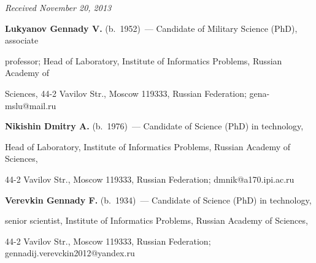 \vspace*{-6pt}





\hfill{\small\textit{Received November 20, 2013}}





\vspace*{-6pt}





\Contr





\noindent


\textbf{Lukyanov Gennady V.} (b.\ 1952)~--- Candidate of Military Science (PhD), associate


professor; Head of Laboratory, Institute of Informatics Problems, Russian Academy of


Sciences, 44-2 Vavilov Str., Moscow 119333, Russian Federation; gena-mslu@mail.ru





\vspace*{3pt}





\noindent


\textbf{Nikishin Dmitry A.} (b.\ 1976)~---  Candidate of Science (PhD) in technology,


Head of Laboratory, Institute of Informatics Problems, Russian Academy of Sciences,


44-2 Vavilov Str., Moscow 119333, Russian Federation; dmnik@a170.ipi.ac.ru





\vspace*{3pt}


\noindent


\textbf{Verevkin Gennady F.} (b.\ 1934)~--- Candidate of Science (PhD) in technology,


senior scientist, Institute of Informatics Problems, Russian Academy of Sciences,


44-2 Vavilov Str., Moscow 119333, Russian Federation; gennadij.verevckin2012@yandex.ru





\label{end\stat}





\renewcommand{\bibname}{\protect\rmfamily Литература}








